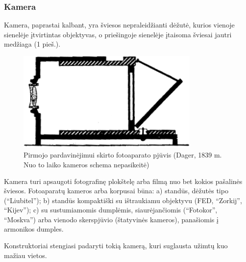 \documentclass[12pt]{book}
\begin{document}
				\subsubsection*{Kamera}
					Kamera, paprastai kalbant, yra šviesos nepraleidžianti dėžutė, kurios vienoje sienelėje įtvirtintas objektyvas, o priešingoje sienelėje įtaisoma šviesai jautri medžiaga (1 pieš.).
					\begin{figure}[h]
						\centering
						\includegraphics[width=0.8\textwidth]{1-pav}
						\caption{Pirmojo pardavinėjimui skirto fotoaparato pjūvis (Dager, 1839 m. Nuo to laiko kameros schema nepasikeitė)}
						\label{fig:1}
					\end{figure}
					Kamera turi apsaugoti fotografinę plokštelę arba filmą nuo bet kokios pašalinės šviesos. Fotoaparatų kameros arba korpusai būna: a) standūs, dėžutės tipo (``Liubitel''); b) standūs kompaktiški su ištraukiamu objektyvu (FED, ``Zorkij'', ``Kijev''); c) su sustumiamomis dumplėmis, siaurėjančiomis (``Fotokor'', ``Moskva'') arba vienodo skerspjūvio (štatyvinės kameros), panašiomis į armonikos dumples.

					Konstruktoriai stengiasi padaryti tokią kamerą, kuri suglausta užimtų kuo mažiau vietos.
\end{document}
